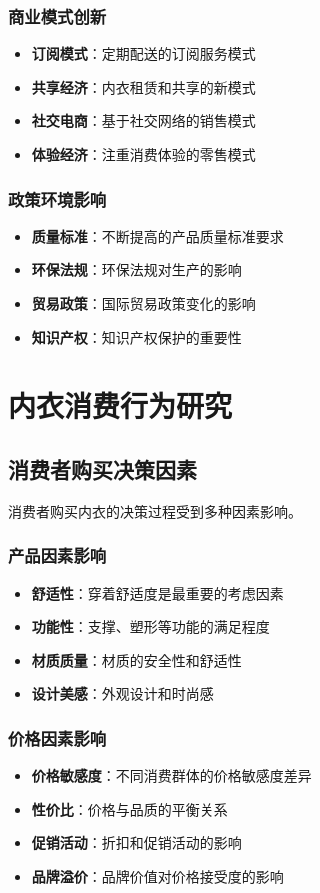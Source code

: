 \documentclass[12pt,UTF8]{ctexbook}
\begin{document}
\subsection{商业模式创新}
\begin{itemize}[leftmargin=2cm]
	\item \textbf{订阅模式}：定期配送的订阅服务模式
	\item \textbf{共享经济}：内衣租赁和共享的新模式
	\item \textbf{社交电商}：基于社交网络的销售模式
	\item \textbf{体验经济}：注重消费体验的零售模式
\end{itemize}

\subsection{政策环境影响}
\begin{itemize}[leftmargin=2cm]
	\item \textbf{质量标准}：不断提高的产品质量标准要求
	\item \textbf{环保法规}：环保法规对生产的影响
	\item \textbf{贸易政策}：国际贸易政策变化的影响
	\item \textbf{知识产权}：知识产权保护的重要性
\end{itemize}

\chapter{内衣消费行为研究}
\section{消费者购买决策因素}
消费者购买内衣的决策过程受到多种因素影响。

\subsection{产品因素影响}
\begin{itemize}[leftmargin=2cm]
	\item \textbf{舒适性}：穿着舒适度是最重要的考虑因素
	\item \textbf{功能性}：支撑、塑形等功能的满足程度
	\item \textbf{材质质量}：材质的安全性和舒适性
	\item \textbf{设计美感}：外观设计和时尚感
\end{itemize}

\subsection{价格因素影响}
\begin{itemize}[leftmargin=2cm]
	\item \textbf{价格敏感度}：不同消费群体的价格敏感度差异
	\item \textbf{性价比}：价格与品质的平衡关系
	\item \textbf{促销活动}：折扣和促销活动的影响
	\item \textbf{品牌溢价}：品牌价值对价格接受度的影响
\end{itemize}
\end{document}
